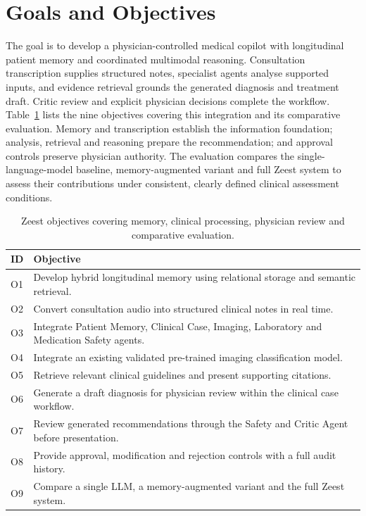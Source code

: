 \section{Goals and Objectives}

The goal is to develop a physician-controlled medical copilot with longitudinal patient memory and coordinated multimodal reasoning. Consultation transcription supplies structured notes, specialist agents analyse supported inputs, and evidence retrieval grounds the generated diagnosis and treatment draft. Critic review and explicit physician decisions complete the workflow. Table~\ref{tab:kashaf:objectives} lists the nine objectives covering this integration and its comparative evaluation. Memory and transcription establish the information foundation; analysis, retrieval and reasoning prepare the recommendation; and approval controls preserve physician authority. The evaluation compares the single-language-model baseline, memory-augmented variant and full Zeest system to assess their contributions under consistent, clearly defined clinical assessment conditions.

\begin{table}[htbp]
\centering
\small
\caption{Zeest objectives covering memory, clinical processing, physician review and comparative evaluation.}
\label{tab:kashaf:objectives}
\begin{tabular}{|p{}|p{}|}
\hline
ID & Objective \\ \hline
O1 & Develop hybrid longitudinal memory using relational storage and semantic retrieval. \\ \hline
O2 & Convert consultation audio into structured clinical notes in real time. \\ \hline
O3 & Integrate Patient Memory, Clinical Case, Imaging, Laboratory and Medication Safety agents. \\ \hline
O4 & Integrate an existing validated pre-trained imaging classification model. \\ \hline
O5 & Retrieve relevant clinical guidelines and present supporting citations. \\ \hline
O6 & Generate a draft diagnosis for physician review within the clinical case workflow. \\ \hline
O7 & Review generated recommendations through the Safety and Critic Agent before presentation. \\ \hline
O8 & Provide approval, modification and rejection controls with a full audit history. \\ \hline
O9 & Compare a single LLM, a memory-augmented variant and the full Zeest system. \\ \hline
\end{tabular}
\end{table}


